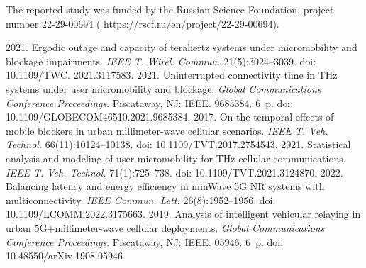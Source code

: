   
 
  

\vspace*{-8pt}

 \Ack
  \noindent
  The reported study was funded by the Russian Science Foundation, project number 22-29-00694 ({\sf 
https://rscf.ru/en/project/22-29-00694}). 


\vspace*{12pt}

  \begin{multicols}{2}

\renewcommand{\bibname}{\protect\rmfamily References}

{\small\frenchspacing
 {%
 \begin{thebibliography}{99}
   2021. Ergodic outage and capacity of terahertz systems under micromobility 
and blockage impairments. \textit{IEEE T. Wirel. Commun.} 21(5):3024--3039. 
doi: 10.1109/TWC. 2021.3117583.
2021. Uninterrupted connectivity time in THz systems under user micromobility and blockage. 
\textit{Global Communications Conference Proceedings}. Piscataway, NJ: IEEE. 
9685384. 6~p. doi: 10.1109/GLOBECOM46510.2021.9685384.
   2017. On the 
temporal effects of mobile blockers in urban millimeter-wave cellular scenarios. \textit{IEEE 
T. Veh. Technol.} 66(11):10124--10138. doi: 10.1109/TVT.2017.2754543.
2021. Statistical analysis and modeling of user micromobility for THz cellular communications. 
\textit{IEEE T. Veh. Technol.} 71(1):725--738. doi: 10.1109/TVT.2021.3124870.
   2022. Balancing latency and energy efficiency in mmWave 5G NR systems 
with multiconnectivity. \textit{IEEE Commun. Lett.} 26(8):1952--1956. doi: 
10.1109/LCOMM.2022.3175663.
 2019. Analysis of intelligent 
vehicular relaying in urban 5G\;+\;millimeter-wave cellular deployments. \textit{Global 
Communications Conference Proceedings}. Piscataway, NJ: IEEE. 05946. 6~p. doi: 
10.48550/arXiv.1908.05946.
  

\end{thebibliography}}}
\end{multicols}
